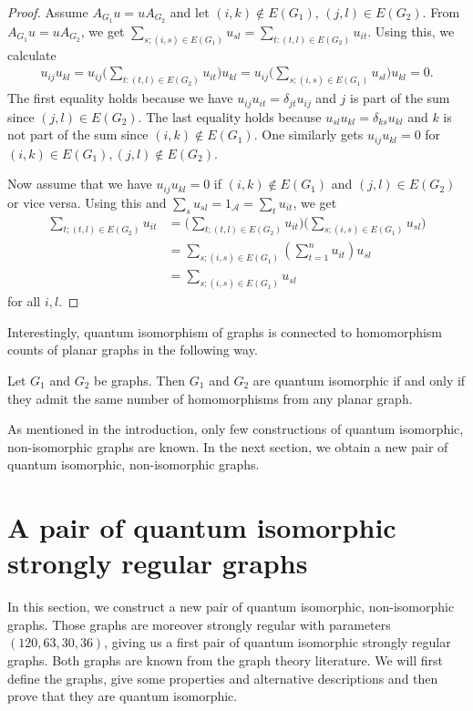 \begin{proof}
Assume $A_{G_1}u=uA_{G_2}$ and let $(i,k)\notin E(G_1)$, $(j,l)\in E(G_2)$. From $A_{G_1}u=uA_{G_2}$, we get $\sum_{s;(i,s)\in E(G_1)}u_{sl}=\sum_{t:(t,l)\in E(G_2)} u_{it}$. Using this, we calculate
\begin{align*}
    u_{ij}u_{kl}= u_{ij}\bigg(\sum_{t:(t,l)\in E(G_2)} u_{it}\bigg)u_{kl}=u_{ij}\bigg(\sum_{s;(i,s)\in E(G_1)}u_{sl}\bigg)u_{kl}=0.
\end{align*}
The first equality holds because we have $u_{ij}u_{it}=\delta_{jt}u_{ij}$ and $j$ is part of the sum since $(j,l)\in E(G_2)$. The last equality holds because $u_{sl}u_{kl}=\delta_{ks}u_{kl}$ and $k$ is not part of the sum since $(i,k)\notin E(G_1)$. One similarly gets $u_{ij}u_{kl}=0$ for $(i,k)\in E(G_1), (j,l)\notin E(G_2)$. 

Now assume that we have $u_{ij}u_{kl}=0$ if $(i,k)\notin E(G_1)$ and $(j,l)\in E(G_2)$ or vice versa. Using this and $\sum_s u_{sl}=1_{\mathcal{A}}=\sum_t u_{it}$, we get
\begin{align*}
    \sum_{t;(t,l)\in E(G_2)}u_{it}&=\bigg(\sum_{t;(t,l)\in E(G_2)}u_{it}\bigg)\bigg(\sum_{s;(i,s)\in E(G_1)}u_{sl}\bigg)\\
    &=\sum_{s;(i,s)\in E(G_1)}\left(\sum_{t=1}^nu_{it}\right)u_{sl}\\
    &=\sum_{s;(i,s)\in E(G_1)}u_{sl}
\end{align*}
for all $i,l$. 
\end{proof}

Interestingly, quantum isomorphism of graphs is connected to homomorphism counts of planar graphs in the following way. 

\begin{theo}\cite{MRplanar}
Let $G_1$ and $G_2$ be graphs. Then $G_1$ and $G_2$ are quantum isomorphic if and only if they admit the same number of homomorphisms from any planar graph. 
\end{theo}

As mentioned in the introduction, only few constructions of quantum isomorphic, non-isomorphic graphs are known. In the next section, we obtain a new pair of quantum isomorphic, non-isomorphic graphs.

\section{A pair of quantum isomorphic strongly regular graphs}\label{secpairqiso}

In this section, we construct a new pair of quantum isomorphic, non-isomorphic graphs. Those graphs are moreover strongly regular with parameters $(120, 63, 30, 36)$, giving us a first pair of quantum isomorphic strongly regular graphs. Both graphs are known from the graph theory literature. We will first define the graphs, give some properties and alternative descriptions and then prove that they are quantum isomorphic. 

